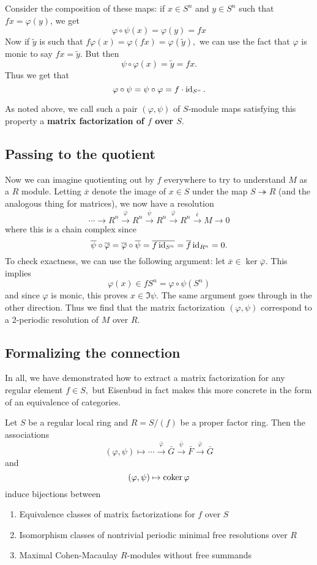 \documentclass [11pt, proquest] {uwthesis}[2020/02/24]
\begin{document}
    Consider the composition of these maps: if $x\in S^n$ and $y\in S^n$ such that $fx=\varphi(y)$, we get
    \[\varphi\circ\psi(x)=\varphi(y)=fx\]
    Now if $\tilde y$ is such that $f\varphi(x)=\varphi(fx)=\varphi(\tilde y),$ we can use the fact that $\varphi$ is monic to say $fx=\tilde y$. But then
    \[\psi\circ\varphi(x)=\tilde y=fx.\]
    Thus we get that 
    \[\varphi\circ\psi=\psi\circ\varphi=f\cdot\operatorname{id}_{S^n}.\]
    
    As noted above, we call such a pair $(\varphi,\psi)$ of $S$-module maps satisfying this property a \textbf{matrix factorization of $f$ over $S$}.

\subsection{Passing to the quotient}
    Now we can imagine quotienting out by $f$ everywhere to try to understand $M$ as a $R$ module. Letting $\overline x$ denote the image of $x\in S$ under the map $S\twoheadrightarrow R$ (and the analogous thing for matrices), we now have a resolution
    \[\cdots\to R^n\xrightarrow{\overline\varphi}R^n\xrightarrow{\overline \psi}R^n\xrightarrow{\overline \varphi}R^n\xrightarrow{\overline\epsilon}M\to 0\]
    where this is a chain complex since
    \[\overline\psi\circ\overline\varphi=\overline\varphi\circ\overline\psi=\overline{f\operatorname{id}_{S^n}}=\overline{f}\operatorname{id}_{R^n}=0.\]
    To check exactness, we can use the following argument: let $\overline x\in \ker\overline\varphi.$ This implies
    \[\varphi(x)\in fS^n=\varphi\circ\psi(S^n)\]
    and since $\varphi$ is monic, this proves $x\in \Im\psi.$ The same argument goes through in the other direction. Thus we find that the matrix factorization $(\varphi,\psi)$ correspond to a 2-periodic resolution of $M$ over $R.$ 
    
\subsection{Formalizing the connection}
    In all, we have demonstrated how to extract a matrix factorization for any regular element $f\in S,$ but Eisenbud in fact makes this more concrete in the form of an equivalence of categories.
    
    \begin{thm}
        Let $S$ be a regular local ring and $R=S/(f)$ be a proper factor ring. Then the associations
        \[(\varphi,\psi)\mapsto \cdots\xrightarrow{\bar\varphi}\bar G\xrightarrow{\bar\psi}\bar F\xrightarrow{\bar\varphi}\bar G\]
        and
        \[(\varphi,\psi)\mapsto \operatorname{coker}\varphi\]
        induce bijections between
        \begin{enumerate}
            \item Equivalence classes of matrix factorizations for $f$ over $S$
            \item Isomorphism classes of nontrivial periodic minimal free resolutions over $R$
            \item Maximal Cohen-Macaulay $R$-modules without free summands
        \end{enumerate}
    \end{thm}
    
\end{document}
